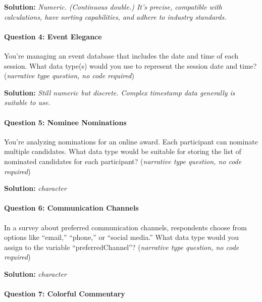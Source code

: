 \documentclass[
]{article}
\begin{document}
\textbf{Solution:} \emph{Numeric. (Continuous double.) It's precise,
compatible with calculations, have sorting capabilities, and adhere to
industry standards.}

\hypertarget{question-4-event-elegance}{%
\paragraph{Question 4: Event Elegance}\label{question-4-event-elegance}}

You're managing an event database that includes the date and time of
each session. What data type(s) would you use to represent the session
date and time? (\emph{narrative type question, no code required})

\textbf{Solution:} \emph{Still numeric but discrete. Complex timestamp
data generally is suitable to use.}

\hypertarget{question-5-nominee-nominations}{%
\paragraph{Question 5: Nominee
Nominations}\label{question-5-nominee-nominations}}

You're analyzing nominations for an online award. Each participant can
nominate multiple candidates. What data type would be suitable for
storing the list of nominated candidates for each participant?
(\emph{narrative type question, no code required})

\textbf{Solution:} \emph{character}

\hypertarget{question-6-communication-channels}{%
\paragraph{Question 6: Communication
Channels}\label{question-6-communication-channels}}

In a survey about preferred communication channels, respondents choose
from options like ``email,'' ``phone,'' or ``social media.'' What data
type would you assign to the variable ``preferredChannel''?
(\emph{narrative type question, no code required})

\textbf{Solution:} \emph{character}

\hypertarget{question-7-colorful-commentary}{%
\paragraph{Question 7: Colorful
Commentary}\label{question-7-colorful-commentary}}
\end{document}
